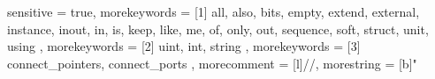 {
  sensitive = true,
  morekeywords = [1]{
    all,
    also,
    bits,
    empty,
    extend,
    external,
    instance,
    inout,
    in,
    is,
    keep,
    like,
    me,
    of,
    only,
    out,
    sequence,
    soft,
    struct,
    unit,
    using
  },
  morekeywords = [2]{
    uint,
    int,
    string
  }, 
  morekeywords = [3]{
    connect_pointers,
    connect_ports
  },
  morecomment = [l]{//},
  morestring = [b]"
}